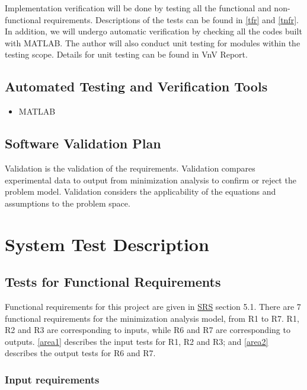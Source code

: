 \documentclass[12pt, titlepage]{article}
\begin{document}
Implementation verification will be done by testing all the functional and non-functional requirements. Descriptions of the tests can be found in \autoref{tfr} and \autoref{tnfr}. 
In addition, we will undergo automatic verification by checking
all the codes built with MATLAB. The author will also conduct unit testing for modules
within the testing scope. Details for unit testing can be found in VnV Report.


\subsection{Automated Testing and Verification Tools}

\begin{itemize}
	\item MATLAB
\end{itemize}

\subsection{Software Validation Plan}

Validation is the validation of the requirements. Validation compares experimental data to output from minimization analysis to confirm or reject the problem model. Validation considers the applicability of the equations and assumptions to the problem space.


\section{System Test Description}
\label{systd}
	
\subsection{Tests for Functional Requirements}
\label{tfr}

Functional requirements for this project are given in 
\href{https://github.com/KarenKarenWang/cas741_project1/blob/main/docs/SRS/SRS.pdf}
{SRS} section 5.1. There are 7 functional requirements for the minimization analysis model, from R1 to R7.
R1, R2 and R3 are corresponding to inputs, while R6 and R7 are corresponding to outputs.
\autoref{area1} describes the input tests for R1, R2 and R3; and \autoref{area2} 
describes the output tests for R6 and R7.

\subsubsection{Input requirements}\label{Ainput}
\label{area1}
\end{document}
